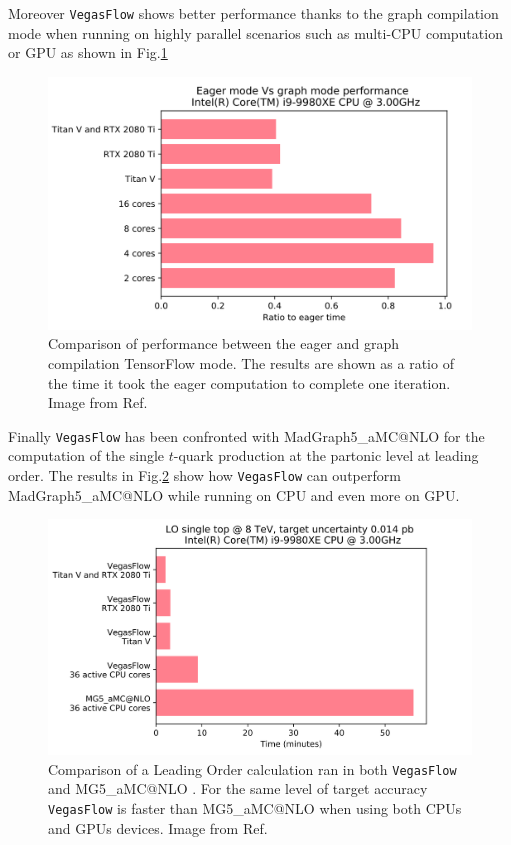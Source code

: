 \documentclass[../main/main.tex]{subfiles}
\begin{document}
Moreover \texttt{VegasFlow} shows better performance thanks to the graph compilation mode when running on highly parallel scenarios such as
multi-CPU computation or GPU as shown in Fig.\ref{vegasflow1}

\begin{figure}
	\centering
	\includegraphics[width=12cm]{../images/graph_mode.png}
	\caption{Comparison of performance between the eager and graph compilation TensorFlow mode. The results are shown as a ratio of the time it took the eager computation to complete one iteration. Image from Ref\cite{Carrazza:2020rdn}.}
	\label{vegasflow1}
\end{figure}


Finally \texttt{VegasFlow} has been confronted with MadGraph5\_aMC@NLO \cite{Alwall:2014hca} for the computation of the single $t$-quark production at the partonic level at leading order. The results in Fig.\ref{vegasflow2} show how \texttt{VegasFlow} can outperform  MadGraph5\_aMC@NLO while running on CPU and even more on GPU.

\begin{figure}
	\centering
	\includegraphics[width=12cm]{../images/vf_singletop.png}
	\caption{Comparison of a Leading Order calculation ran in both \texttt{VegasFlow} \cite{vegasflow_package} and MG5\_aMC@NLO \cite{Alwall:2014hca}. For the same level 
	of target accuracy \texttt{VegasFlow} is faster than  MG5\_aMC@NLO when using both CPUs and GPUs devices. Image from Ref\cite{Carrazza:2020rdn}.}
	\label{vegasflow2}
\end{figure}
\end{document}
